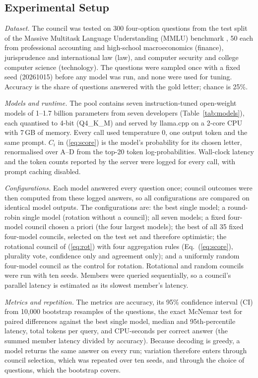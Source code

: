 \subsection{Experimental Setup}
\textit{Dataset.} The council was tested on 300 four-option questions from the test split of the Massive Multitask Language Understanding (MMLU) benchmark \cite{hendrycks2021mmlu}, 50 each from professional accounting and high-school macroeconomics (finance), jurisprudence and international law (law), and computer security and college computer science (technology). The questions were sampled once with a fixed seed (20261015) before any model was run, and none were used for tuning. Accuracy is the share of questions answered with the gold letter; chance is 25\%.

\textit{Models and runtime.} The pool contains seven instruction-tuned open-weight models of 1--1.7 billion parameters from seven developers (Table~\ref{tab:models}), each quantised to 4-bit (Q4\_K\_M) and served by llama.cpp \cite{llamacpp} on a 2-core CPU with 7\,GB of memory. Every call used temperature 0, one output token and the same prompt. $C_i$ in (\ref{eq:score}) is the model's probability for its chosen letter, renormalised over A--D from the top-20 token log-probabilities. Wall-clock latency and the token counts reported by the server were logged for every call, with prompt caching disabled.

\textit{Configurations.} Each model answered every question once; council outcomes were then computed from these logged answers, so all configurations are compared on identical model outputs. The configurations are: the best single model; a round-robin single model (rotation without a council); all seven models; a fixed four-model council chosen a priori (the four largest models); the best of all 35 fixed four-model councils, selected on the test set and therefore optimistic; the rotational council of (\ref{eq:rot}) with four aggregation rules (Eq.~(\ref{eq:score}), plurality vote, confidence only and agreement only); and a uniformly random four-model council as the control for rotation. Rotational and random councils were run with ten seeds. Members were queried sequentially, so a council's parallel latency is estimated as its slowest member's latency. 

\textit{Metrics and repetition.} The metrics are accuracy, its 95\% confidence interval (CI) from 10,000 bootstrap resamples of the questions, the exact McNemar test for paired differences against the best single model, median and 95th-percentile latency, total tokens per query, and CPU-seconds per correct answer (the summed member latency divided by accuracy). Because decoding is greedy, a model returns the same answer on every run; variation therefore enters through council selection, which was repeated over ten seeds, and through the choice of questions, which the bootstrap covers.

